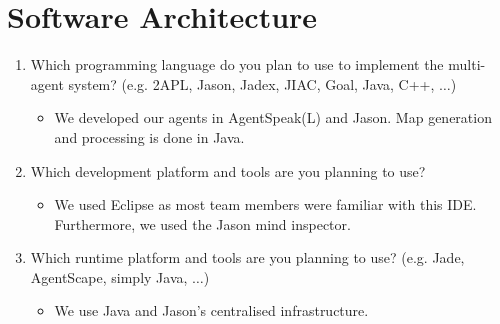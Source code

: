 \documentclass{llncs}
\begin{document}
\section*{Software Architecture}

\begin{enumerate}
\item Which programming language do you plan to use to implement the multi-agent system? (e.g. 2APL, Jason, Jadex, JIAC, Goal, Java, C++, $\ldots$)
  \begin{itemize}
    \item We developed our agents in AgentSpeak(L) and Jason. Map generation and processing is done in Java.
  \end{itemize}
\item Which development platform and tools are you planning to use?
  \begin{itemize}
    \item We used Eclipse as most team members were familiar with this IDE. Furthermore, we used the Jason mind inspector.
  \end{itemize}
\item Which runtime platform and tools are you planning to use? (e.g. Jade, AgentScape, simply Java, $\ldots$)
  \begin{itemize}
    \item We use Java and Jason's centralised infrastructure.
  \end{itemize}

\end{enumerate}
\end{document}
